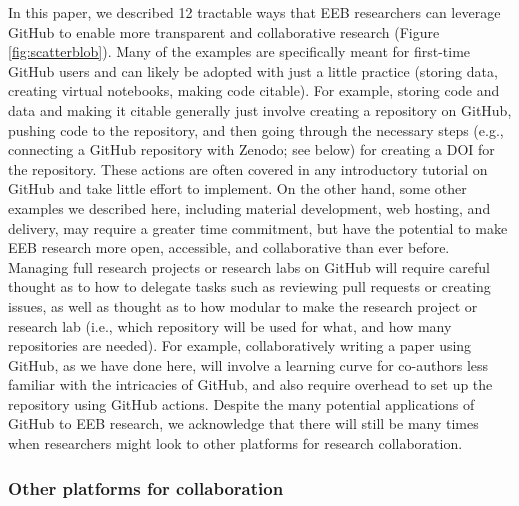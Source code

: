 In this paper, we described 12 tractable ways that EEB researchers can leverage GitHub to enable more transparent and collaborative research (Figure \ref{fig:scatterblob}).
Many of the examples are specifically meant for first-time GitHub users and can likely be adopted with just a little practice (storing data, creating virtual notebooks, making code citable).
For example, storing code and data and making it citable generally just involve creating a repository on GitHub, pushing code to the repository, and then going through the necessary steps (e.g., connecting a GitHub repository with Zenodo; see below) for creating a DOI for the repository.
These actions are often covered in any introductory tutorial on GitHub and take little effort to implement.
On the other hand, some other examples we described here, including material development, web hosting, and delivery, may require a greater time commitment, but have the potential to make EEB research more open, accessible, and collaborative than ever before.
Managing full research projects or research labs on GitHub will require careful thought as to how to delegate tasks such as reviewing pull requests or creating issues, as well as thought as to how modular to make the research project or research lab (i.e., which repository will be used for what, and how many repositories are needed).
For example, collaboratively writing a paper using GitHub, as we have done here, will involve a learning curve for co-authors less familiar with the intricacies of GitHub, and also require overhead to set up the repository using GitHub actions.
Despite the many potential applications of GitHub to EEB research, we acknowledge that there will still be many times when researchers might look to other platforms for research collaboration.

\hypertarget{other-platforms-for-collaboration}{%
\subsubsection{Other platforms for collaboration}\label{other-platforms-for-collaboration}}

